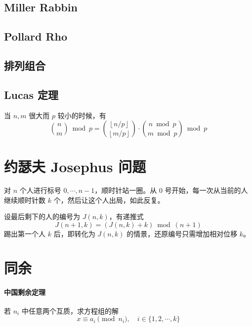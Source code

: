 \documentclass{probook}
\begin{document}
\begin{multicols}{2}


\subsection{Miller Rabbin}



\subsection{Pollard Rho}



\subsection{排列组合}

\subsection{Lucas 定理}

当 $n,m$ 很大而 $p$ 较小的时候，有
\[  
\binom{n}{m}\bmod p = \binom{\left\lfloor n/p \right\rfloor}{\left\lfloor m/p\right\rfloor}\cdot\binom{n\bmod p}{m\bmod p}\bmod p 
\]



\section{约瑟夫 Josephus 问题}

对 $n$ 个人进行标号 $0,\cdots,n-1$，顺时针站一圈。从 $0$ 号开始，每一次从当前的人继续顺时针数 $k$ 个，然后让这个人出局，如此反复。

设最后剩下的人的编号为 $J(n,k)$，有递推式
\[J(n+1,k) = (J(n,k)+k) \bmod (n+1)\]
踢出第一个人 $k$ 后，即转化为 $J(n,k)$ 的情景，还原编号只需增加相对位移 $k$。



\section{同余}

\paragraph{中国剩余定理}
若 $n_i$ 中任意两个互质，求方程组的解
\[ x \equiv a_i \pmod {n_i} , \quad i \in \{ 1,2,\cdots,k \} \]


\end{multicols}
\end{document}
